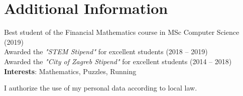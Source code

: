 \documentclass[letterpaper,11pt]{article}
\begin{document}


\section{Additional Information}
\begin{itemize}[leftmargin=0.15in, label={}]
  \small{\item{
     Best student of the Financial Mathematics course in MSc Computer Science (2019) \\
     Awarded the \textit{"STEM Stipend"} for excellent students (2018 -- 2019) \\
     Awarded the \textit{"City of Zagreb Stipend"} for excellent students (2014 -- 2018) \\ \vspace{3pt}
     \textbf{Interests}: Mathematics, Puzzles, Running
    }}
\end{itemize}

\mbox{}
\vfill
I authorize the use of my personal data according to local law.


\end{document}
